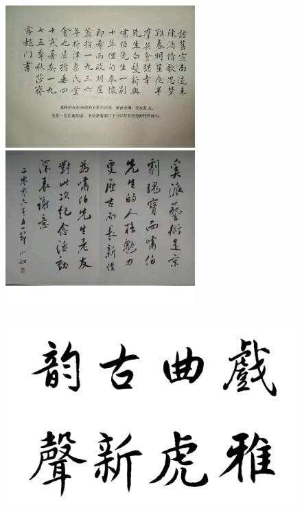 \documentclass[cjk,slidestop,compress,mathserif,blue]{beamer}
\begin{document}
\frame
{
	\frametitle{}
\begin{figure}[h!]
\centering
\vspace{-0.15in}
\includegraphics[height=0.45\textwidth,width=0.65\textwidth,clip]{Figures/PekOpe_Wu-1.jpg}
\vskip -25pt
\includegraphics[height=0.45\textwidth,width=0.65\textwidth,clip]{Figures/PekOpe_Wu-2.jpg}
\label{Wu_xiaoru-2}
\end{figure}
}

\frame
{
	\frametitle{}
\begin{figure}[h!]
\centering
\vspace{-0.15in}
\includegraphics[height=0.65\textwidth,width=1.00\textwidth,clip]{Figures/PekOpe_Wu-3.jpg}
\label{Wu_xiaoru-3}
\end{figure}
}
\end{document}
